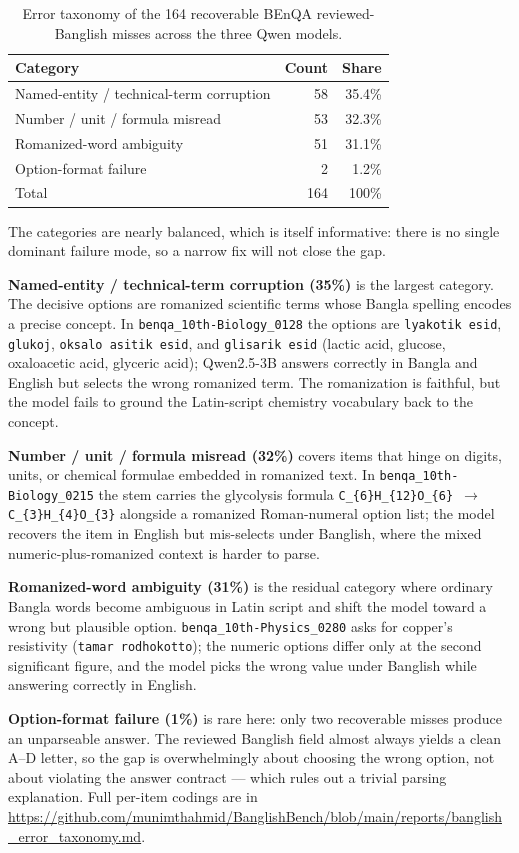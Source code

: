 \begin{table}[H]
\centering
\caption{Error taxonomy of the 164 recoverable BEnQA reviewed-Banglish misses across the three Qwen models.}
\label{tab:error-taxonomy}
\small
\begin{tabular}{lrr}
\hline
Category & Count & Share \\
\hline
Named-entity / technical-term corruption & 58 & 35.4\% \\
Number / unit / formula misread & 53 & 32.3\% \\
Romanized-word ambiguity & 51 & 31.1\% \\
Option-format failure & 2 & 1.2\% \\
\hline
Total & 164 & 100\% \\
\hline
\end{tabular}%
\end{table}

The categories are nearly balanced, which is itself informative: there is no single dominant failure mode, so a narrow fix will not close the gap.

\textbf{Named-entity / technical-term corruption (35\%)} is the largest category. The decisive options are romanized scientific terms whose Bangla spelling encodes a precise concept. In \texttt{benqa\_10th-Biology\_0128} the options are \texttt{lyakotik esid}, \texttt{glukoj}, \texttt{oksalo asitik esid}, and \texttt{glisarik esid} (lactic acid, glucose, oxaloacetic acid, glyceric acid); Qwen2.5-3B answers correctly in Bangla and English but selects the wrong romanized term. The romanization is faithful, but the model fails to ground the Latin-script chemistry vocabulary back to the concept.

\textbf{Number / unit / formula misread (32\%)} covers items that hinge on digits, units, or chemical formulae embedded in romanized text. In \texttt{benqa\_10th-Biology\_0215} the stem carries the glycolysis formula \texttt{C\_\{6\}H\_\{12\}O\_\{6\} $\rightarrow$ C\_\{3\}H\_\{4\}O\_\{3\}} alongside a romanized Roman-numeral option list; the model recovers the item in English but mis-selects under Banglish, where the mixed numeric-plus-romanized context is harder to parse.

\textbf{Romanized-word ambiguity (31\%)} is the residual category where ordinary Bangla words become ambiguous in Latin script and shift the model toward a wrong but plausible option. \texttt{benqa\_10th-Physics\_0280} asks for copper's resistivity (\texttt{tamar rodhokotto}); the numeric options differ only at the second significant figure, and the model picks the wrong value under Banglish while answering correctly in English.

\textbf{Option-format failure (1\%)} is rare here: only two recoverable misses produce an unparseable answer. The reviewed Banglish field almost always yields a clean A--D letter, so the gap is overwhelmingly about choosing the wrong option, not about violating the answer contract --- which rules out a trivial parsing explanation. Full per-item codings are in \url{https://github.com/munimthahmid/BanglishBench/blob/main/reports/banglish_error_taxonomy.md}.

\endinput
